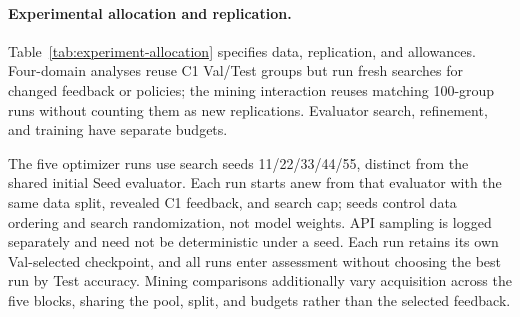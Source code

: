 \paragraph{Experimental allocation and replication.}
Table~\ref{tab:experiment-allocation} specifies data, replication, and allowances.
Four-domain analyses reuse C1 Val/Test groups but run fresh searches for changed feedback or policies; the mining interaction reuses matching 100-group runs without counting them as new replications.
Evaluator search, refinement, and training have separate budgets.

The five optimizer runs use search seeds 11/22/33/44/55, distinct from the shared initial Seed evaluator.
Each run starts anew from that evaluator with the same data split, revealed C1 feedback, and search cap; seeds control data ordering and search randomization, not model weights.
API sampling is logged separately and need not be deterministic under a seed.
Each run retains its own Val-selected checkpoint, and all runs enter assessment without choosing the best run by Test accuracy.
Mining comparisons additionally vary acquisition across the five blocks, sharing the pool, split, and budgets rather than the selected feedback.

